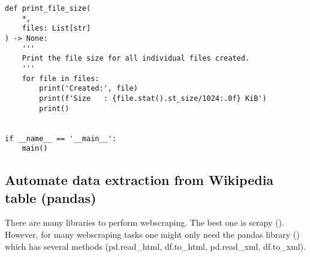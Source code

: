 \documentclass[10pt, letterpaper, twoside]{article}
\begin{document}
\begin{footnotesize}
\begin{verbatim}
def print_file_size(
    *,
    files: List[str]
) -> None:
    '''
    Print the file size for all individual files created.
    '''
    for file in files:
        print('Created:', file)
        print(f'Size   : {file.stat().st_size/1024:.0f} KiB')
        print()


if __name__ == '__main__':
    main()

\end{verbatim}
\end{footnotesize}
\subsection{Automate data extraction from Wikipedia table (pandas)}\label{sec:automate_data_extraction_from_wikipedia_table}
There are many libraries to perform \gls{webscraping}. The best one is \Gls{scrapy} (\cite{scrapy}). However, for many \gls{webscraping} tasks one might only need the \gls{pandas} library (\cite{pandas}) which has several methods (pd.read\_html, df.to\_html, pd.read\_xml, df.to\_xml).
\end{document}
